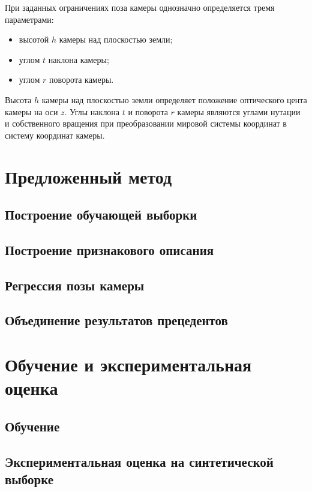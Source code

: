 При заданных ограничениях поза камеры однозначно определяется тремя параметрами:
\begin{itemize}
	\item высотой $h$ камеры над плоскостью земли;
	\item углом $t$ наклона камеры;
	\item углом $r$ поворота камеры.
\end{itemize}

Высота $h$ камеры над плоскостью земли определяет положение оптического цента камеры на оси $z$. Углы наклона $t$ и поворота $r$ камеры являются углами нутации и собственного вращения при преобразовании мировой системы координат в систему координат камеры.

\section{Предложенный метод}
\subsection{Построение обучающей выборки}
\subsection{Построение признакового описания}
\subsection{Регрессия позы камеры}
\subsection{Объединение результатов прецедентов}
\section{Обучение и экспериментальная оценка}
\subsection{Обучение}
\subsection{Экспериментальная оценка на синтетической выборке}
